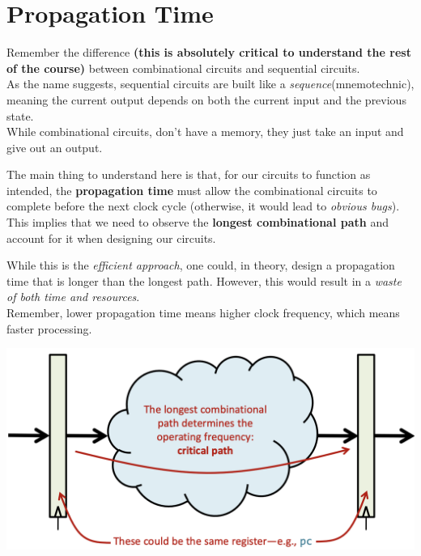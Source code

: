 \section{Propagation Time}
Remember the difference \textbf{(this is absolutely critical to understand the rest of the course)} between combinational circuits and sequential circuits. \\ \vspace*{5px} 
As the name suggests, sequential circuits are built like a \textit{sequence}(mnemotechnic), meaning the current output depends on both the current input and the previous state. \\ \vspace*{5px} 
While combinational circuits, don't have a memory, they just take an input and give out an output.  \\ \vspace*{5px}
\begin{minipage}[htp]{0.45\textwidth}
The main thing to understand here is that, for our circuits to function as intended, the \textbf{propagation time} must allow the combinational circuits to complete before the next clock cycle (otherwise, it would lead to \textit{obvious bugs}). \\ \vspace*{5px}
This implies that we need to observe the \textbf{longest combinational path} and account for it when designing our circuits.\\ \vspace*{5px}

While this is the \textit{efficient approach}, one could, in theory, design a propagation time that is longer than the longest path. However, this would result in a \textit{waste of both time and resources}.\\ \vspace*{5px}
Remember, lower propagation time means higher clock frequency, which means faster processing.
\end{minipage}
\hfill
\vline
\hfill
\begin{minipage}[htp]{0.45\textwidth}
\begin{center}
    \includegraphics[width=1.2\textwidth]{chapters/chapter2a/images/prop_time.png}
\end{center}
\end{minipage}\\


